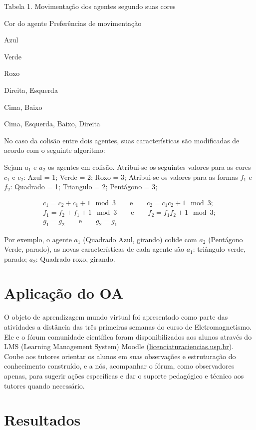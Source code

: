 \documentclass{article}
\begin{document}
Tabela 1. Movimentação dos agentes segundo suas cores

Cor do agente Preferências de movimentação

Azul

Verde

Roxo

Direita, Esquerda

Cima, Baixo

Cima, Esquerda, Baixo, Direita

No caso da colisão entre dois agentes, suas características são modificadas de
acordo com o seguinte algoritmo:

Sejam $a_1$ e $a_2$ os agentes em colisão. Atribui-se os seguintes valores para as cores $c_1$ e $c_2$: Azul = 1; Verde = 2; Roxo = 3;
Atribui-se os valores para as formas $f_1$ e $f_2$: Quadrado = 1; Triangulo = 2; Pentágono = 3;

\begin{gather}
c_1 = c_2 + c_1 + 1 \mod 3 \qquad\text{e}\qquad c_2 = c_1 c_2 + 1 \mod 3;\\
f_1 = f_2 + f_1 + 1 \mod 3 \qquad\text{e}\qquad f_2 = f_1 f_2 + 1 \mod 3;\\
g_1 = g_2 \qquad\text{e}\qquad g_2 = g_1
\end{gather}

Por exemplo, o agente $a_1$ (Quadrado Azul, girando) colide com $a_2$ (Pentágono Verde, parado),
as novas características de cada agente são $a_1$: triângulo verde, parado;
$a_2$: Quadrado roxo, girando. %

\section{Aplicação do OA}

O objeto de aprendizagem mundo virtual foi apresentado como parte das atividades
a distância das três primeiras semanas do curso de Eletromagnetismo. Ele e o fórum
comunidade científica foram disponibilizados aos alunos através do LMS (Learning
Management System) Moodle (\url{licenciaturaciencias.usp.br}). Coube aos tutores orientar
os alunos em suas observações e estruturação do conhecimento construído, e a nós,
acompanhar o fórum, como observadores apenas, para sugerir ações específicas e dar o
suporte pedagógico e técnico aos tutores quando necessário.

\section{Resultados}
\end{document}
